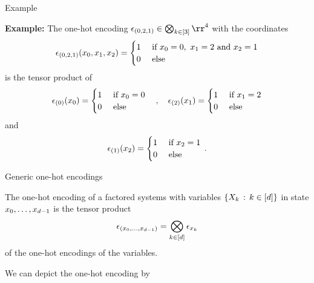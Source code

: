 \documentclass{beamer}
\begin{document}
\begin{frame}{Example}

\textbf{Example:} The one-hot encoding $\onehotmapof{(0,2,1)} \in  \bigotimes_{\atomenumerator\in[3]}\rr^4$
	with the coordinates 
\begin{align*}
	\epsilon_{(0,2,1)}(x_{0},x_{1},x_{2}) = \begin{cases}
	1 & \text{  if  } x_{0} = 0, \,\, x_{1} = 2 \text{  and  } x_{2} = 1 \\
	0 & \text{ else}
	\end{cases}
\end{align*}
is the tensor product of 
\begin{align*}
	\epsilon_{(0)}(x_{0}) = \begin{cases}
	1 & \text{  if  } x_{0} = 0 \\
	0 & \text{ else}
	\end{cases} 
	\quad  , \quad 
	\epsilon_{(2)}(x_{1}) = \begin{cases}
	1 & \text{  if  } x_{1} = 2 \\
	0 & \text{ else}
	\end{cases} 	
\end{align*}
and
\begin{align*}
	\epsilon_{(1)}(x_{2}) = \begin{cases}
	1 & \text{  if  } x_{2} = 1 \\
	0 & \text{ else}
	\end{cases} \, .
\end{align*}


\end{frame}


\begin{frame}{Generic one-hot encodings}
	\begin{definition}
		The one-hot encoding of a factored systems with variables $\{X_{k} \, : \, k\in[d] \}$ in state $x_{0},\ldots,x_{d-1}$ is the tensor product 
 		\begin{align}
			\epsilon_{(x_{0},\ldots,x_{d-1})} = \bigotimes_{k\in[d]} \epsilon_{x_{k}} 
		\end{align}
		of the one-hot encodings of the variables.
	\end{definition}
	We can depict the one-hot encoding by
	\begin{center}
		
	\end{center}
\end{frame}
\end{document}
